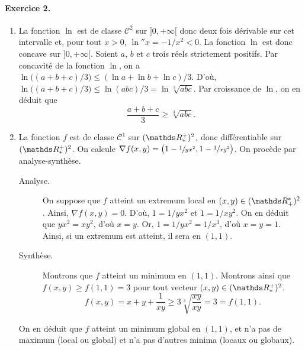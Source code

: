 \documentclass[a4paper]{article}
\begin{document}
	\paragraph{Exercice 2.}
	\begin{enumerate}
		\item La fonction $\ln$\/ est de classe $\mathcal{C}^2$ sur $]0,+\infty[$ donc deux fois dérivable sur cet intervalle et, pour tout $x > 0$, $\ln'' x = -1/x^2 < 0$. La fonction $\ln$\/ est donc concave sur $]0,+\infty[$.
			Soient $a$, $b$ et $c$ trois réels strictement positifs.
			Par concavité de la fonction $\ln$, on a $\ln\big((a + b + c) / 3\big) \le (\ln a + \ln b + \ln c) / 3$.
			D'où, $\ln\big((a+b+c) / 3\big) \le \ln(abc) / 3 = \ln \sqrt[3]{abc} $.
			Par croissance de $\ln$, on en déduit que \[
				\frac{a+b+c}{3} \ge \sqrt[3]{abc} 
			.\]
		\item La fonction $f$ est de classe $\mathcal{C}^1$ sur $(\R^+_*)^2$, donc différentiable sur $(\R^+_*)^2$. On calcule $\nabla f(x,y) = \big(1 - \sfrac1{yx^2},1 - \sfrac1{xy^2}\big)$.
			On procède par analyse-synthèse.
			\begin{description}
				\item[Analyse.] On suppose que $f$ atteint un extremum local en $(x,y) \in (\R_+^*)^2$. Ainsi, $\nabla f(x,y) = 0$.
					D'où, $1 = 1 / yx^2$ et $1 = 1/xy^2$. On en déduit que $yx^2 = xy^2$, d'où $x = y$.
					Or, $1 = 1 / yx^2 = 1 / x^3$, d'où $x = y = 1$.
					Ainsi, si un extremum est atteint, il sera en $(1,1)$.
				\item[Synthèse.] Montrons que $f$ atteint un minimum en $(1,1)$.
					Montrons ainsi que $f(x,y) \ge f(1,1) = 3$ pour tout vecteur $(x,y) \in (\R^+_*)^2$.
					\[
						f(x,y) = x + y + \frac{1}{xy} \ge 3 \sqrt[3]{\frac{xy}{xy}} = 3 = f(1,1)
					.\]
			\end{description}
			On en déduit que $f$ atteint un minimum global en $(1,1)$, et n'a pas de maximum (local ou global) et n'a pas d'autres minima (locaux ou globaux).
	\end{enumerate}
\end{document}
